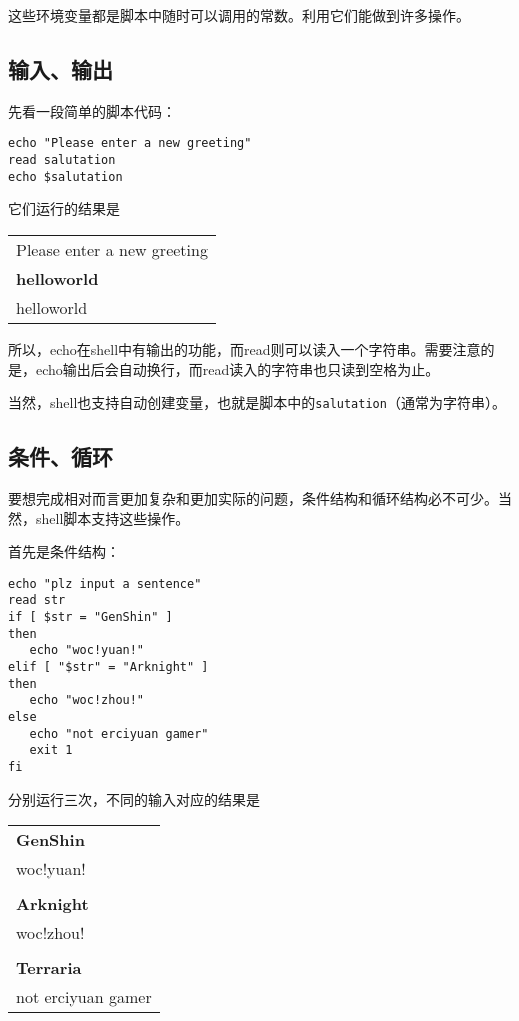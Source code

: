\documentclass[UTF8]{article}
\begin{document}
这些环境变量都是脚本中随时可以调用的常数。利用它们能做到许多操作。

\subsection{输入、输出}

先看一段简单的脚本代码：

\begin{verbatim}
echo "Please enter a new greeting"
read salutation
echo $salutation
\end{verbatim}

它们运行的结果是

\begin{tabular}{|l|}
  \hline
Please enter a new greeting\\
\textbf{helloworld}\\
helloworld\\
\hline
\end{tabular}

所以，echo在shell中有输出的功能，而read则可以读入一个字符串。需要注意的是，echo输出后会自动换行，而read读入的字符串也只读到空格为止。

当然，shell也支持自动创建变量，也就是脚本中的\verb|salutation|（通常为字符串）。

\subsection{条件、循环}

要想完成相对而言更加复杂和更加实际的问题，条件结构和循环结构必不可少。当然，shell脚本支持这些操作。

首先是条件结构：

\begin{verbatim}
echo "plz input a sentence"
read str
if [ $str = "GenShin" ]
then
   echo "woc!yuan!"
elif [ "$str" = "Arknight" ]
then
   echo "woc!zhou!"
else
   echo "not erciyuan gamer"
   exit 1
fi
\end{verbatim}

分别运行三次，不同的输入对应的结果是

\begin{tabular}{|l|}
  \hline
\textbf{GenShin}\\
woc!yuan!\\
\\
\textbf{Arknight}\\
woc!zhou!\\
\\
\textbf{Terraria}\\
not erciyuan gamer\\
\hline
\end{tabular}
\end{document}
